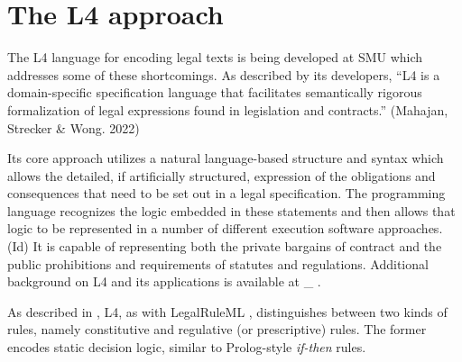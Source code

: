 \documentclass{article}
\begin{document}

\section{The L4 approach}
The L4 language for encoding legal texts is being developed at SMU which
addresses some of these shortcomings.
As described by its developers,
``L4 is a domain-specific specification language that facilitates semantically
rigorous formalization of legal expressions found in legislation and
contracts.''
(Mahajan, Strecker \& Wong. 2022)

Its core approach utilizes a natural language-based structure and syntax which
allows the detailed, if artificially structured, expression of the obligations
and consequences that need to be set out in a legal specification.
The programming language recognizes the logic embedded in these statements and
then allows that logic to be represented in a number of different execution
software approaches.
(Id)
It is capable of representing both the private bargains of contract and the
public prohibitions and requirements of statutes and regulations.
Additional background on L4 and its applications is available at \_ . 


As described in
,
L4, as with LegalRuleML , distinguishes between two
kinds of rules, namely constitutive and regulative (or prescriptive) rules.
The former encodes static decision logic, similar to Prolog-style
\textit{if-then} rules.
\end{document}
